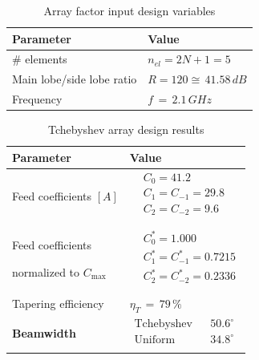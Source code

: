 \documentclass[10 pt,a4paper,twocolumn]{article}
\begin{document}
{\begin{table}[b!]
	\begin{center}
		{
		\selectfont	\begin{tabular}{|m{4cm}|m{4cm}|}
				\hline
				\cellcolor{deepsaffron}\textbf{Parameter} & \cellcolor{deepsaffron}\textbf{Value}\\
				\hline
				\# elements & $n_{el}=2N+1=5$\\
				\hline
				Main lobe/side lobe
				ratio  & $R = 120 \cong\, 41.58\,dB$\\
				\hline 
				Frequency & $f\,=\,2.1\,GHz$\\
				\hline
		\end{tabular}}
		\caption{Array factor input design variables}
		\label{table:input_design_cheb}
	\end{center}
\end{table}
\begin{table}[b!] 
	\begin{center}
		{\selectfont
			\begin{tabular}{|m{4cm}|m{4cm}|}
				\hline
				\cellcolor{deepsaffron}\textbf{Parameter}
				& \cellcolor{deepsaffron}\textbf{Value} 
				\\
				\hline
				{Feed coefficients} $[A]$ &  \footnotesize{$\begin{aligned}
						&C_0 = 	41.2						\\
						&C_1=C_{-1} = 29.8 \\
						&C_{2}=C_{-2} = 9.6 \\
					\end{aligned}$}\\
				\hline 
				{Feed coefficients 
					
					normalized to $C_{\max}$} &  
				\footnotesize{$\begin{aligned}
						&C_0^* = 	1.000						\\
						& C_1^*=C_{-1}^* = 0.7215 \\
						& C_{2}^*=C_{-2}^*  =0.2336 \\
					\end{aligned}$} \\
				\hline
				{Tapering efficiency} & \footnotesize{$\eta_T\,=\,79\,\%$}\\ 
				\hline 
				\textbf{Beamwidth} & $ \begin{matrix}
					\text{Tchebyshev} & &50.6^\circ \\
					
					\text{Uniform} &  & 34.8^\circ\\
				\end{matrix} $ \\
				\hline 
		\end{tabular}}
		\caption{Tchebyshev array design results}
		\label{table:tcheby results}
	\end{center}
\end{table}
\indent 

}
\end{document}
